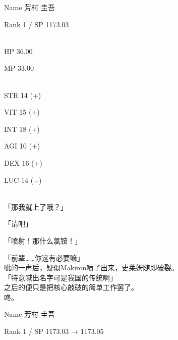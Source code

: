 \cardline

  Name 芳村 圭吾

  Rank 1 / SP 1173.03

%  
\\

  HP  36.00

  MP  33.00

%  
\\

  STR 14 (+)

  VIT 15 (+)

  INT 18 (+)

  AGI 10 (+)

  DEX 16 (+)

  LUC 14 (+)

\cardline\\

「那我就上了哦？」

「请吧」

「喷射！那什么氯铵！」

「前辈……你这有必要嘛」\\

呲的一声后，疑似Makiron喷了出来，史莱姆随即破裂。\\

「特意喊出名字可是我国的传统啊」\\

之后的便只是把核心敲破的简单工作罢了。\\

咚。\\

\cardline

  Name 芳村 圭吾

  Rank 1 / SP 1173.03 → 1173.05

%  
\\

